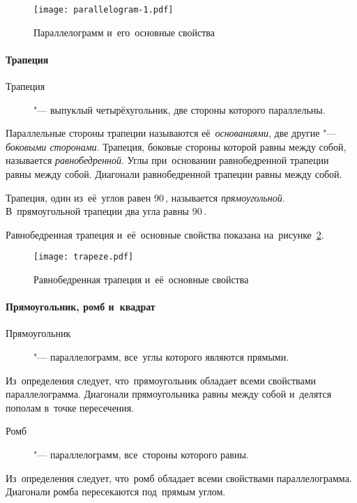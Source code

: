 \documentclass[]{scrartcl}
\begin{document}
\begin{figure}[ht]
	\centering %
	\texttt{[image: parallelogram-1.pdf]}
	\caption{Параллелограмм и~его~основные свойства}\label{fig:parallelogram-1}
\end{figure}

\paragraph{Трапеция}
\begin{description}
	\item[Трапеция] "--- выпуклый четырёхугольник, две стороны которого параллельны.
\end{description}
Параллельные стороны трапеции называются её~\emph{основаниями}, две другие "--- \emph{боковыми сторонами}. Трапеция, боковые стороны которой равны между собой, называется \emph{равнобедренной}. Углы при~основании равнобедренной трапеции равны между собой. Диагонали равнобедренной трапеции равны между собой. 

Трапеция, один из~её~углов равен 90\,\textdegree, называется \emph{прямоугольной}. В~прямоугольной трапеции два угла равны 90\,\textdegree.

Равнобедренная трапеция и~её~основные свойства показана на~рисунке~\ref{fig:trapeze}.

\begin{figure}[ht]
	\centering %
	\texttt{[image: trapeze.pdf]}
	\caption{Равнобедренная трапеция и~её~основные свойства}\label{fig:trapeze}
\end{figure}

\paragraph{Прямоугольник, ромб и~квадрат}
\begin{description}
	\item[Прямоугольник] "--- параллелограмм, все~углы которого являются прямыми.
\end{description}
Из~определения следует, что~прямоугольник обладает всеми свойствами параллелограмма. Диагонали прямоугольника равны между собой и~делятся пополам в~точке пересечения.

\begin{description}
	\item[Ромб] "--- параллелограмм, все~стороны которого равны.
\end{description}
Из~определения следует, что~ромб обладает всеми свойствами параллелограмма. Диагонали ромба пересекаются под~прямым углом.
\end{document}
